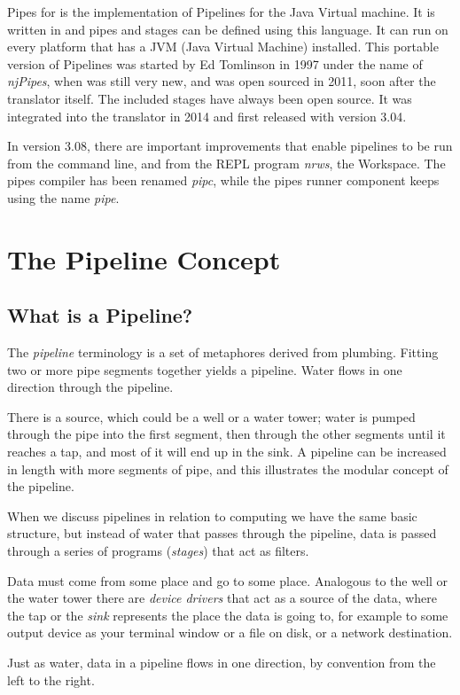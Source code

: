 Pipes for \nr{} is the implementation of Pipelines for the Java Virtual
machine. It is written in \nr{} and pipes and stages can be defined using this
language. It can run on every platform that has a JVM
(Java Virtual Machine) installed. This portable version of Pipelines was started
by Ed Tomlinson in 1997 under the name of \emph{njPipes}, when \nr{} was
still very new, and was open sourced in 2011, soon after the \nr{}
translator itself. The included stages have always been open source. It was integrated into the \nr{} translator in
2014 and first released with version 3.04.

In version 3.08, there are
important improvements that enable pipelines to be run from the
command line, and from the \nr{} REPL program \emph{nrws}, the
\nr{} Workspace. The pipes compiler has been renamed
\emph{pipc}, while the pipes runner component keeps using the name \emph{pipe}.

\chapter{The Pipeline Concept}
\section{What is a Pipeline?}
The \emph{pipeline} terminology is a set of metaphores derived from
plumbing. Fitting two or more pipe segments together yields a
pipeline. Water flows in one direction through the pipeline.

There is a source, which could be a well or a water tower; water is
pumped through the pipe into the first segment, then through the other
segments until it reaches a tap, and most of it will end up in the
sink. A pipeline can be increased in length with more segments of
pipe, and this illustrates the modular concept of the pipeline.

When we discuss pipelines in relation to computing we have the same
basic structure, but instead of water that passes through the
pipeline, data is passed through a series of programs (\emph{stages})
that act as filters.

Data must come from some place and go to some place. Analogous to the
well or the water tower there are \emph{device drivers} that act as a
source of the data, where the tap or the \emph{sink} represents the place the
data is going to, for example to some output device as your terminal
window or a file on disk, or a network destination.

Just as water, data in a pipeline flows in one direction, by
convention from the left to the right.

